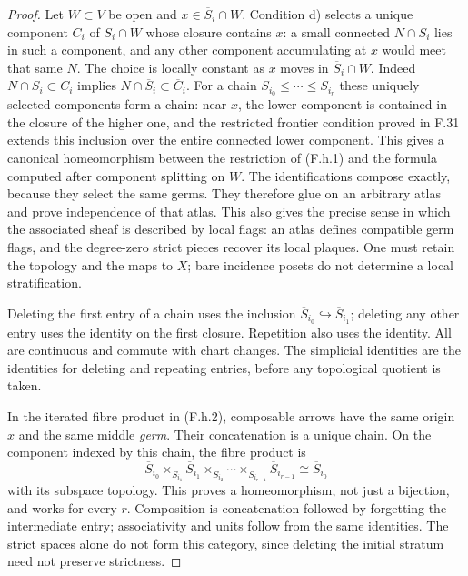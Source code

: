 \begin{proof}
Let $W\subset V$ be open and $x\in\overline S_i\cap W$. Condition d)
selects a unique component $C_i$ of $S_i\cap W$ whose closure contains
$x$: a small connected $N\cap S_i$ lies in such a component, and any
other component accumulating at $x$ would meet that same $N$.
The choice is locally constant as $x$ moves in $\overline S_i\cap W$.
Indeed $N\cap S_i\subset C_i$ implies
$N\cap\overline S_i\subset\overline C_i$.
For a chain $S_{i_0}\leq\cdots\leq S_{i_r}$ these uniquely selected
components form a chain: near $x$, the lower component is contained in
the closure of the higher one, and the restricted frontier condition
proved in F.31 extends this inclusion over the entire connected lower
component. This gives a canonical homeomorphism between the restriction
of (F.h.1) and the formula computed after component splitting on $W$.
The identifications compose exactly, because they select the same germs.
They therefore glue on an arbitrary atlas and prove independence of
that atlas. This also gives the precise sense in which the associated
sheaf is described by local flags: an atlas defines compatible germ
flags, and the degree-zero strict pieces recover its local plaques.
One must retain the topology and the maps to $X$; bare incidence posets
do not determine a local stratification.

Deleting the first entry of a chain uses the inclusion
$\overline S_{i_0}\hookrightarrow\overline S_{i_1}$; deleting any other
entry uses the identity on the first closure. Repetition also uses the
identity. All are continuous and commute with chart changes. The
simplicial identities are the identities for deleting and repeating
entries, before any topological quotient is taken.

In the iterated fibre product in (F.h.2), composable arrows have the
same origin $x$ and the same middle \emph{germ}. Their concatenation
is a unique chain. On the component indexed by this chain, the fibre
product is
\[
 \overline S_{i_0}
 \times_{\overline S_{i_1}}\overline S_{i_1}
 \times_{\overline S_{i_2}}\cdots
 \times_{\overline S_{i_{r-1}}}\overline S_{i_{r-1}}
 \cong\overline S_{i_0}
\]
with its subspace topology. This proves a homeomorphism, not just a
bijection, and works for every $r$. Composition is concatenation followed
by forgetting the intermediate entry; associativity and units follow
from the same identities. The strict spaces alone do not form this
category, since deleting the initial stratum need not preserve strictness.


\end{proof}
